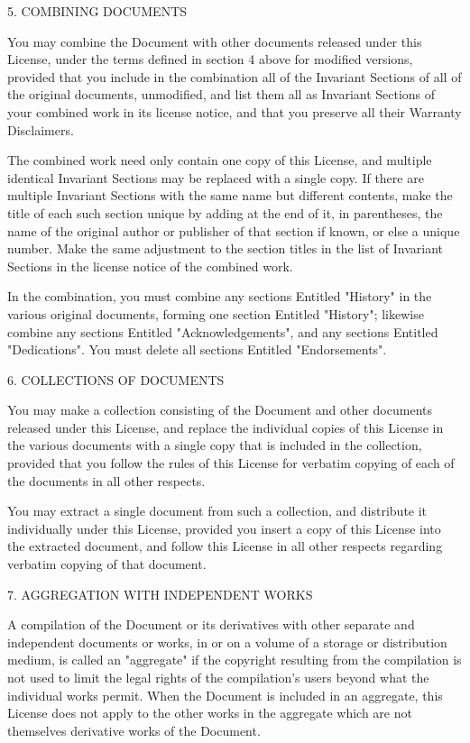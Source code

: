 \documentclass[a4paper,11pt]{report}
\begin{document}
{ 5. COMBINING DOCUMENTS 

 You may combine the Document with other documents released under this License,
under the terms defined in section 4 above for modified versions, provided
that you include in the combination all of the Invariant Sections of all of
the original documents, unmodified, and list them all as Invariant Sections of
your combined work in its license notice, and that you preserve all their
Warranty Disclaimers. 

 The combined work need only contain one copy of this License, and multiple
identical Invariant Sections may be replaced with a single copy. If there are
multiple Invariant Sections with the same name but different contents, make
the title of each such section unique by adding at the end of it, in
parentheses, the name of the original author or publisher of that section if
known, or else a unique number. Make the same adjustment to the section titles
in the list of Invariant Sections in the license notice of the combined work. 

 In the combination, you must combine any sections Entitled "History" in the
various original documents, forming one section Entitled "History"; likewise
combine any sections Entitled "Acknowledgements", and any sections Entitled
"Dedications". You must delete all sections Entitled "Endorsements". 

 6. COLLECTIONS OF DOCUMENTS 

 You may make a collection consisting of the Document and other documents
released under this License, and replace the individual copies of this License
in the various documents with a single copy that is included in the
collection, provided that you follow the rules of this License for verbatim
copying of each of the documents in all other respects. 

 You may extract a single document from such a collection, and distribute it
individually under this License, provided you insert a copy of this License
into the extracted document, and follow this License in all other respects
regarding verbatim copying of that document. 

 7. AGGREGATION WITH INDEPENDENT WORKS 

 A compilation of the Document or its derivatives with other separate and
independent documents or works, in or on a volume of a storage or distribution
medium, is called an "aggregate" if the copyright resulting from the
compilation is not used to limit the legal rights of the compilation's users
beyond what the individual works permit. When the Document is included in an
aggregate, this License does not apply to the other works in the aggregate
which are not themselves derivative works of the Document. 

}
\end{document}
